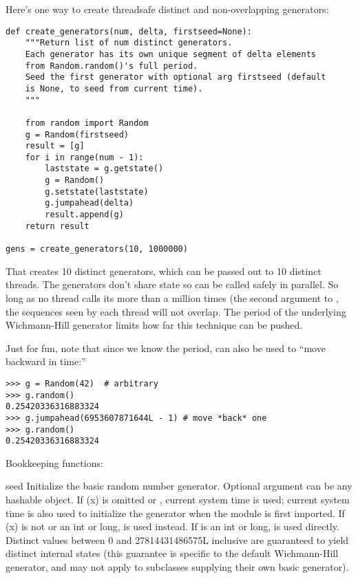 Here's one way to create threadsafe distinct and non-overlapping generators:

\begin{verbatim}
def create_generators(num, delta, firstseed=None):
    """Return list of num distinct generators.
    Each generator has its own unique segment of delta elements
    from Random.random()'s full period.
    Seed the first generator with optional arg firstseed (default
    is None, to seed from current time).
    """

    from random import Random
    g = Random(firstseed)
    result = [g]
    for i in range(num - 1):
        laststate = g.getstate()
        g = Random()
        g.setstate(laststate)
        g.jumpahead(delta)
        result.append(g)
    return result

gens = create_generators(10, 1000000)
\end{verbatim}

That creates 10 distinct generators, which can be passed out to 10
distinct threads.  The generators don't share state so can be called
safely in parallel.  So long as no thread calls its 
more than a million times (the second argument to
, the sequences seen by each thread will
not overlap.  The period of the underlying Wichmann-Hill generator
limits how far this technique can be pushed.

Just for fun, note that since we know the period, 
can also be used to ``move backward in time:''

\begin{verbatim}
>>> g = Random(42)  # arbitrary
>>> g.random()
0.25420336316883324
>>> g.jumpahead(6953607871644L - 1) # move *back* one
>>> g.random()
0.25420336316883324
\end{verbatim}


Bookkeeping functions:

\begin{funcdesc}{seed}{}
  Initialize the basic random number generator.
  Optional argument  can be any hashable object.
  If \var(x) is omitted or , current system time is used;
  current system time is also used to initialize the generator when the
  module is first imported.
  If \var(x) is not  or an int or long,
   is used instead.
  If  is an int or long,  is used directly.
  Distinct values between 0 and 27814431486575L inclusive are guaranteed
  to yield distinct internal states (this guarantee is specific to the
  default Wichmann-Hill generator, and may not apply to subclasses
  supplying their own basic generator).
\end{funcdesc}


